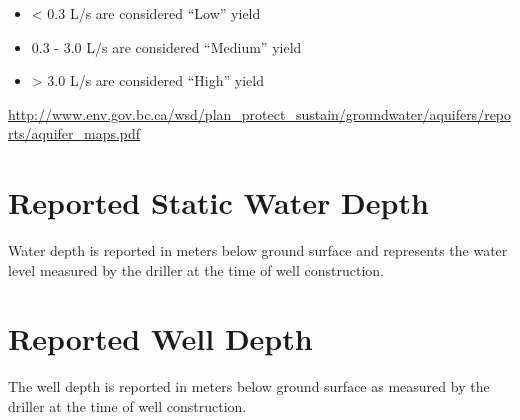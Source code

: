 \documentclass[11pt,]{article}
\providecommand{\tightlist}{%
  \setlength{\itemsep}{0pt}\setlength{\parskip}{0pt}}
\begin{document}
\begin{itemize}
\tightlist
\item
  \textless{} 0.3 L/s are considered ``Low'' yield
\item
  0.3 - 3.0 L/s are considered ``Medium'' yield
\item
  \textgreater{} 3.0 L/s are considered ``High'' yield
\end{itemize}

\url{http://www.env.gov.bc.ca/wsd/plan_protect_sustain/groundwater/aquifers/reports/aquifer_maps.pdf}

\section{Reported Static Water Depth}\label{reported-static-water-depth}

Water depth is reported in meters below ground surface and represents
the water level measured by the driller at the time of well
construction.

\section{Reported Well Depth}\label{reported-well-depth}

The well depth is reported in meters below ground surface as measured by
the driller at the time of well construction.

\vspace{5mm}
\end{document}
